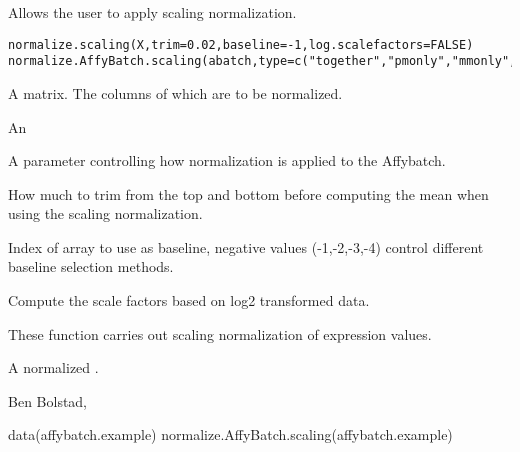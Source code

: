 \begin{Description}\relax
Allows the user to apply scaling normalization.
\end{Description}
\begin{Usage}
\begin{verbatim}
normalize.scaling(X,trim=0.02,baseline=-1,log.scalefactors=FALSE)
normalize.AffyBatch.scaling(abatch,type=c("together","pmonly","mmonly","separate"),trim=0.02,baseline=-1,log.scalefactors=FALSE)
\end{verbatim}
\end{Usage}
\begin{Arguments}
\begin{ldescription}
\item[\code{X}] A matrix. The columns of which are to be normalized.
\item[\code{abatch}] An 
\item[\code{type}] A parameter controlling how normalization is applied to
the Affybatch.
\item[\code{trim}] How much to trim from the top and bottom before computing
the mean when using the scaling normalization.
\item[\code{baseline}] Index of array to use as baseline, negative values
(-1,-2,-3,-4) control different baseline selection methods.
\item[\code{log.scalefactors}] Compute the scale factors based on log2
transformed data.
\end{ldescription}
\end{Arguments}
\begin{Details}\relax
These function carries out scaling normalization of expression values.
\end{Details}
\begin{Value}
A normalized .
\end{Value}
\begin{Author}\relax
Ben Bolstad, 
\end{Author}
\begin{SeeAlso}\relax
{}
\end{SeeAlso}
\begin{Examples}
\begin{ExampleCode}
data(affybatch.example)
normalize.AffyBatch.scaling(affybatch.example)
\end{ExampleCode}
\end{Examples}

